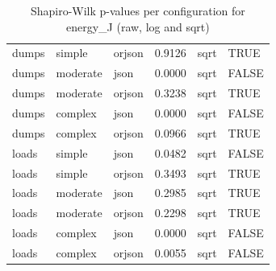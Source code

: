 \begin{table}[ht]
\begin{tabular}{lllrll}
  dumps & simple & orjson & 0.9126 & sqrt & TRUE \\ 
  dumps & moderate & json & 0.0000 & sqrt & FALSE \\ 
  dumps & moderate & orjson & 0.3238 & sqrt & TRUE \\ 
  dumps & complex & json & 0.0000 & sqrt & FALSE \\ 
  dumps & complex & orjson & 0.0966 & sqrt & TRUE \\ 
  loads & simple & json & 0.0482 & sqrt & FALSE \\ 
  loads & simple & orjson & 0.3493 & sqrt & TRUE \\ 
  loads & moderate & json & 0.2985 & sqrt & TRUE \\ 
  loads & moderate & orjson & 0.2298 & sqrt & TRUE \\ 
  loads & complex & json & 0.0000 & sqrt & FALSE \\ 
  loads & complex & orjson & 0.0055 & sqrt & FALSE \\ 
   \bottomrule
\end{tabular}
\caption{Shapiro-Wilk p-values per configuration for energy_J (raw, log and sqrt)} 
\label{tab:normality_RQ1_energy}
\end{table}
